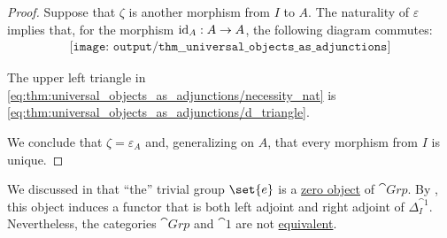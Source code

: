 \begin{proof}
  Suppose that \( \zeta \) is another morphism from \( I \) to \( A \). The naturality of \( \varepsilon \) implies that, for the morphism \( \operatorname{id}_A: A \to A \), the following diagram commutes:
  \begin{equation}\label{eq:thm:universal_objects_as_adjunctions/necessity_nat}
    \begin{aligned}
      \texttt{[image: output/thm\_\_universal\_objects\_as\_adjunctions]}
    \end{aligned}
  \end{equation}

  The upper left triangle in \eqref{eq:thm:universal_objects_as_adjunctions/necessity_nat} is \eqref{eq:thm:universal_objects_as_adjunctions/d_triangle}.

  We conclude that \( \zeta = \varepsilon_A \) and, generalizing on \( A \), that every morphism from \( I \) is unique.
\end{proof}

\begin{remark}\label{rem:left_and_right_adjoint_not_equivalence}
  We discussed in  that \enquote{the} trivial group \( \set{ e } \) is a \hyperref[def:universal_objects/zero]{zero object} of \( \cat{Grp} \). By , this object induces a functor that is both left adjoint and right adjoint of \( \Delta_I^{\cat{1}} \). Nevertheless, the categories \( \cat{Grp} \) and \( \cat{1} \) are not \hyperref[def:category_equivalence]{equivalent}.
\end{remark}

